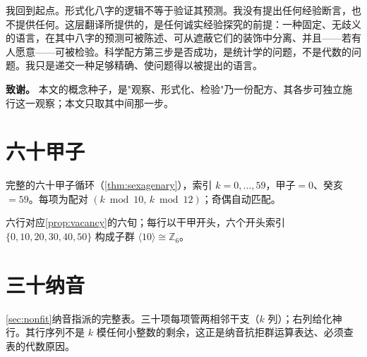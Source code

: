 \documentclass[11pt,a4paper,fontset=none]{ctexart}
\theoremstyle{definition}
\theoremstyle{remark}
\newcommand{\Z}{\mathbb{Z}}
\begin{document}
我回到起点。形式化八字的逻辑不等于验证其预测。我没有提出任何经验断言，也不提供任何。这层翻译所提供的，是任何诚实经验探究的前提：一种固定、无歧义的语言，在其中八字的预测可被陈述、可从遮蔽它们的装饰中分离、并且——若有人愿意——可被检验。科学配方第三步是否成功，是统计学的问题，不是代数的问题。我只是递交一种足够精确、使问题得以被提出的语言。

\bigskip
\noindent\textbf{致谢。} 本文的概念种子，是"观察、形式化、检验"乃一份配方、其各步可独立施行这一观察；本文只取其中间那一步。

\clearpage
\appendix

\section{六十甲子}\label{app:ganzhi}
完整的六十甲子循环（\cref{thm:sexagenary}），索引 $k=0,\dots,59$，甲子$=0$、癸亥$=59$。每项为配对 $(k\bmod 10,\,k\bmod 12)$；奇偶自动匹配。

\begin{center}\footnotesize
{}
\end{center}

六行对应\cref{prop:vacancy}的六旬；每行以干甲开头，六个开头索引 $\{0,10,20,30,40,50\}$ 构成子群 $\langle10\rangle\cong\Z_6$。

\section{三十纳音}\label{app:nayin}
\cref{sec:nonfit}纳音指派的完整表。三十项每项管两相邻干支（$k$ 列）；右列给化神行。其行序列不是 $k$ 模任何小整数的剩余，这正是纳音抗拒群运算表达、必须查表的代数原因。
\end{document}
